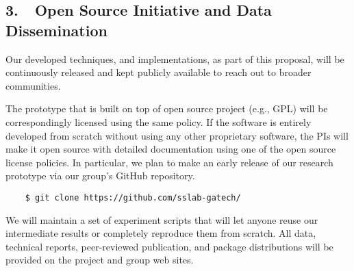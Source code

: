 \vspace{10px}
\subsection*{3.~~Open Source Initiative and Data Dissemination}

Our developed techniques, and implementations, as part of this
proposal, will be continuously released and kept publicly available
to reach out to broader communities.

The prototype that is built on top of open source project (e.g., GPL)
will be correspondingly licensed using the same policy. If the
software is entirely developed from scratch without using any other
proprietary software, the PIs will make it open source with detailed
documentation using one of the open source license policies. In
particular, we plan to make an early release of our research prototype
via our group's GitHub repository.

\begin{verbatim}
    $ git clone https://github.com/sslab-gatech/
\end{verbatim}

We will maintain a set of experiment scripts that will let anyone
reuse our intermediate results or completely reproduce them from
scratch.
%
All data, technical reports, peer-reviewed publication, and package
distributions will be provided on the project and group web sites.
